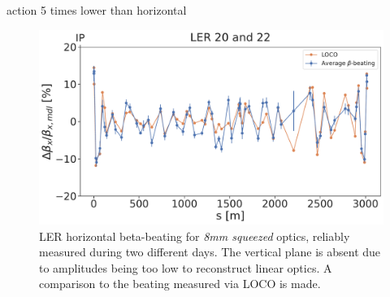 action 5 times lower than horizontal

\begin{figure}[!htb]
    \centering
    \includegraphics[width=0.7\linewidth]{images/kek/ler_20_22_bet_x.pdf}
    \caption{LER horizontal beta-beating for \textit{8mm squeezed} optics, reliably measured during
    two different days. The vertical plane is absent due to amplitudes being too low to reconstruct
    linear optics. A comparison to the beating measured via LOCO is made.}
    \label{fig:kek:beating_ler_squeezed}
\end{figure}



\FloatBarrier
\subsubsection{}

